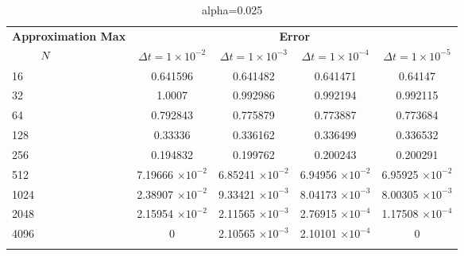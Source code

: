 	\begin{table}
		\begin{tabular}{lcccc}
			\toprule
			\multicolumn{1}{c}{\textbf{Approximation Max}} & \multicolumn{4}{c}{\textbf{Error}} \\
			$\hspace{9mm}N$ & $\Delta t=1\times 10^{-2}$ & $\Delta t=1\times 10^{-3}$ & $\Delta t=1\times 10^{-4}$ & $\Delta t=1\times 10^{-5}$ \\
			\midrule
			\hspace{7mm} 16 & 0.641596  & 0.641482   & 0.641471    & 0.64147     \\
			\midrule
			\hspace{7mm} 32 & 1.0007    & 0.992986   & 0.992194    & 0.992115    \\
			\midrule
			\hspace{7mm} 64 & 0.792843  & 0.775879   & 0.773887    & 0.773684    \\
			\midrule
			\hspace{7mm} 128 & 0.33336   & 0.336162   & 0.336499    & 0.336532    \\
			\midrule
			\hspace{7mm} 256 & 0.194832  & 0.199762   & 0.200243    & 0.200291    \\
			\midrule
			\hspace{7mm} 512 & 7.19666 $\times 10 ^{-2}$ & 6.85241 $\times 10 ^{-2}$ & 6.94956 $\times 10 ^{-2}$  & 6.95925 $\times 10 ^{-2}$   \\
			\midrule
			\hspace{7mm} 1024 & 2.38907 $\times 10 ^{-2}$ & 9.33421 $\times 10 ^{-3}$ & 8.04173 $\times 10 ^{-3}$  & 8.00305 $\times 10 ^{-3}$  \\
			\midrule
			\hspace{7mm} 2048 & 2.15954 $\times 10 ^{-2}$ & 2.11565 $\times 10 ^{-3}$ & 2.76915 $\times 10 ^{-4}$ & 1.17508 $\times 10 ^{-4}$ \\
			\midrule
			\hspace{7mm} 4096 & 0         & 2.10565 $\times 10 ^{-3}$ & 2.10101 $\times 10 ^{-4}$ & 0           \\
			\\
			\bottomrule
		\end{tabular}
		\caption{alpha=0.025}
	\end{table}


